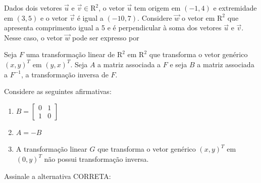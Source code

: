 \documentclass[10pt,a4paper]{article}
\begin{document}
%
{
\def\AMCbeginQuestion#1#2{\par\noindent{\bf (POSCOMP 2007 - Questão 05)}}
\begin{question}{} Dados dois vetores $\vec{u}$ e $\vec{v}\in\mathrm{R}^{2}$, o vetor $\vec{u}$ tem origem em $(-1,4)$ e extremidade em $(3,5)$ e o vetor $\vec{v}$ é igual a $(-10,7)$. Considere $\vec{w}$ o vetor em $\mathrm{R}^{2}$ que apresenta comprimento igual a 5 e é perpendicular à soma dos vetores $\vec{u}$ e $\vec{v}$. Nesse caso, o vetor $\vec{w}$ pode ser expresso por
\begin{choices}
\end{choices}
\end{question}
}
%
{
\def\AMCbeginQuestion#1#2{\par\noindent{\bf (POSCOMP 2009 - Questão 01)}}
\begin{question}{} Seja $F$ uma transformação linear de $\mathrm{R}^{2}$ em $\mathrm{R}^{2}$ que transforma o vetor genérico $(x,y)^{T}$ em $(y,x)^{T}$. Seja $A$ a matriz associada a $F$ e seja $B$ a matriz associada a $F^{-1}$, a transformação inversa de $F$.

Considere as seguintes afirmativas:
\begin{enumerate}
\item[I.] $B=\left[\begin{array}{rr}0&1\\1&0\end{array}\right]$
\item[II.] $A=-B$
\item[III.] A transformação linear $G$ que transforma o vetor genérico $(x,y)^{T}$ em $(0,y)^{T}$ não possui transformação inversa.
\end{enumerate}
Assinale a alternativa CORRETA:
\begin{choices}
\end{choices}
\end{question}
}
%
\end{document}
